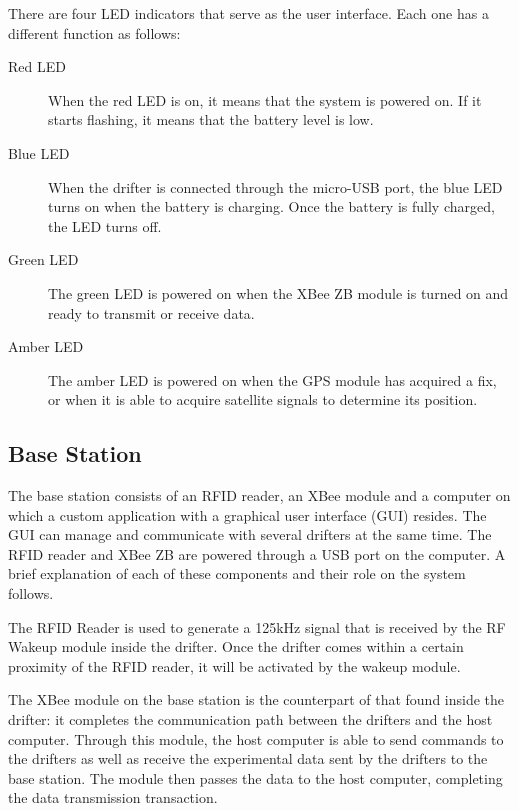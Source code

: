 
There are four LED indicators that serve as the user interface.  Each one has a different function as follows:
\vspace{-12pt}
\begin{description}
\item[Red LED] When the red LED is on, it means that the system is powered on.  If it starts flashing, it means that the battery level is low.

\item[Blue LED] When the drifter is connected through the micro-USB port, the blue LED turns on when the battery is charging.  Once the battery is fully charged, the LED turns off.

\item[Green LED] The green LED is powered on when the XBee ZB module is turned on and ready to transmit or receive data.

\item[Amber LED] The amber LED is powered on when the GPS module has acquired a fix, or when it is able to acquire satellite signals to determine its position.
\end{description}

\subsection{Base Station}
The base station consists of an RFID reader, an XBee module and a computer on which a custom application with a graphical user interface (GUI) resides.  The GUI can manage and communicate with several drifters at the same time. The RFID reader and XBee ZB are powered through a USB port on the computer.  A brief explanation of each of these components and their role on the system follows.


The RFID Reader is used to generate a 125kHz signal that is received by the RF Wakeup module inside the drifter.  Once the drifter comes within a certain proximity of the RFID reader, it will be activated by the wakeup module.


The XBee module on the base station is the counterpart of that found inside the drifter: it completes the communication path between the drifters and the host computer.  Through this module, the host computer is able to send commands to the drifters as well as receive the experimental data sent by the drifters to the base station.  The module then passes the data to the host computer, completing the data transmission transaction.

